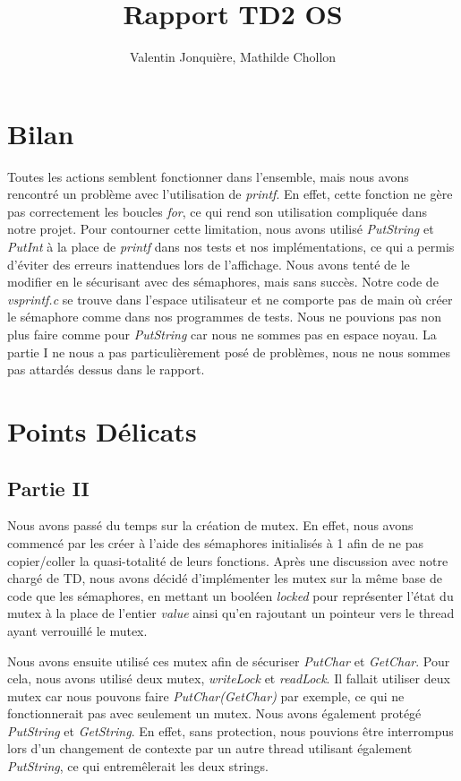 \documentclass{article}
\author{
    Valentin Jonquière,
    Mathilde Chollon
}
\title{Rapport TD2 OS}
\begin{document}
\maketitle

\pagebreak

\tableofcontents

\pagebreak

\section{Bilan}
Toutes les actions semblent fonctionner dans l'ensemble, mais nous avons rencontré 
un problème avec l'utilisation de \textit{printf}. En effet, cette fonction ne gère pas 
correctement les boucles \textit{for}, ce qui rend son utilisation compliquée dans notre
projet. Pour contourner cette limitation, nous avons utilisé \textit{PutString} et 
\textit{PutInt} à la place de \textit{printf} dans nos tests et nos implémentations, 
ce qui a permis d'éviter des erreurs inattendues lors de l'affichage. Nous avons tenté de le 
modifier en le sécurisant avec des sémaphores, mais sans succès. Notre code de \textit{vsprintf.c}
se trouve dans l'espace utilisateur et ne comporte pas de main où créer le sémaphore comme dans
nos programmes de tests. Nous ne pouvions pas non plus faire comme pour \textit{PutString}
car nous ne sommes pas en espace noyau. La partie I ne nous a pas particulièrement posé de problèmes, nous
ne nous sommes pas attardés dessus dans le rapport.

\section{Points Délicats}
\subsection{Partie II}
Nous avons passé du temps sur la création de mutex. En effet, nous avons
commencé par les créer à l'aide des sémaphores initialisés à 1 afin de ne pas
copier/coller la quasi-totalité de leurs fonctions. Après une discussion avec
notre chargé de TD, nous avons décidé d'implémenter les mutex sur la même base
de code que les sémaphores, en mettant un booléen \textit{locked} pour
représenter l'état du mutex à la place de l'entier \textit{value} ainsi qu'en
rajoutant un pointeur vers le thread ayant verrouillé le mutex.

Nous avons ensuite utilisé ces mutex afin de sécuriser \textit{PutChar} et \textit{GetChar}.
Pour cela, nous avons utilisé deux mutex, \textit{writeLock} et \textit{readLock}. Il fallait utiliser
deux mutex car nous pouvons faire \textit{PutChar(GetChar)} par exemple, ce qui ne fonctionnerait
pas avec seulement un mutex. Nous avons également protégé \textit{PutString} et \textit{GetString}.
En effet, sans protection, nous pouvions être interrompus lors d'un changement de contexte par un autre
thread utilisant également \textit{PutString}, ce qui entremêlerait les deux strings.
\end{document}
